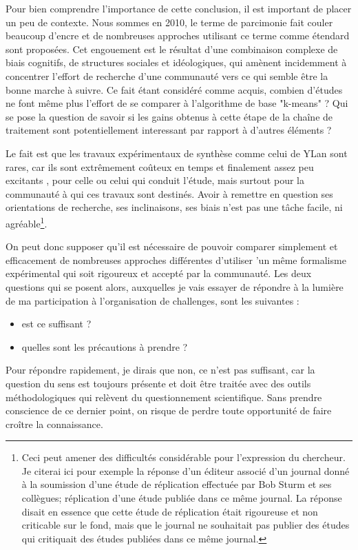 Pour bien comprendre l'importance de cette conclusion, il est important de placer un peu de contexte. Nous sommes en 2010, le terme de parcimonie fait couler beaucoup d'encre et de nombreuses approches utilisant ce terme comme étendard sont proposées. Cet engouement est le résultat d'une combinaison complexe de biais cognitifs, de structures sociales et idéologiques, qui amènent incidemment à concentrer l'effort de recherche d'une communauté vers ce qui semble être la bonne marche à suivre. Ce fait étant considéré comme acquis, combien d'études ne font même plus l'effort de se comparer à l'algorithme de base "k-means" ? Qui se pose la question de savoir si les gains obtenus à cette étape de la chaîne de traitement sont potentiellement interessant par rapport à d'autres éléments ?

Le fait est que les travaux expérimentaux de synthèse comme celui de YLan sont rares, car ils sont extrêmement coûteux en temps et finalement assez peu \fg excitants \og, pour celle ou celui qui conduit l'étude, mais surtout pour la communauté à qui ces travaux sont destinés. Avoir à remettre en question ses orientations de recherche, ses inclinaisons, ses biais n'est pas une tâche facile, ni agréable\footnote{Ceci peut amener des difficultés considérable pour l'expression du chercheur. Je citerai ici pour exemple la réponse d'un éditeur associé d'un journal donné à la soumission d'une étude de réplication effectuée par Bob Sturm et ses collègues; réplication d'une étude publiée dans ce même journal. La réponse disait en essence que cette étude de réplication était rigoureuse et non criticable sur le fond, mais que le journal ne souhaitait pas publier des études qui critiquait des études publiées dans ce même journal.}.

On peut donc supposer qu'il est nécessaire de pouvoir comparer simplement et efficacement de nombreuses approches différentes d'utiliser 'un même formalisme expérimental qui soit rigoureux et accepté par la communauté. Les deux questions qui se posent alors, auxquelles je vais essayer de répondre à la lumière de ma participation à l'organisation de challenges, sont les suivantes :
\begin{itemize}
  \item est ce suffisant ?
  \item quelles sont les précautions à prendre ?
\end{itemize}

Pour répondre rapidement, je dirais que non, ce n'est pas suffisant, car la question du sens est toujours présente et doit être traitée avec des outils méthodologiques qui relèvent du questionnement scientifique. Sans prendre conscience de ce dernier point, on risque de perdre toute opportunité de faire croître la connaissance.

